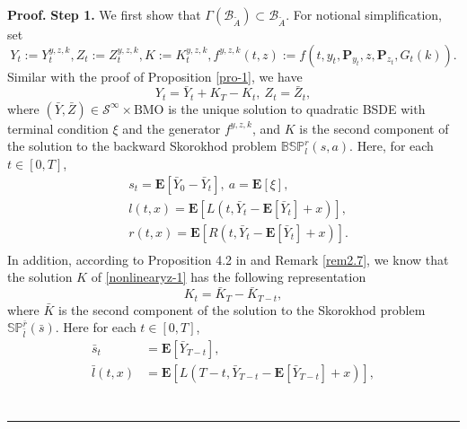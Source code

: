 \documentclass[10pt]{article}%
\numberwithin{equation}{section}
\newenvironment{proof}[1][Proof]{\noindent \textbf{#1.} }{\  \rule{0.5em}{0.5em}}
\def \E{\mathbf{E}}
\def \P{\mathbf{P}}
\begin{document}
\begin{proof}
\textbf{Step 1.} We first show that $\Gamma(\mathscr{B}_{\tilde{A}})\subset \mathscr{B}_{\tilde{A}}$. For notional simplification, set
$$Y_t:=Y^{y,z,k}_t, Z_t:=Z^{y,z,k}_t,K:=K^{y,z,k}_t,f^{y,z,k}(t,z):=f(t,y_t,\P_{y_t},z,\P_{z_{t}},G_{t}(k)).$$
Similar with the proof of Proposition \ref{pro-1}, we have 
 \begin{equation}\label{YmZm}
   Y_{t}=\bar{Y}_{t}+K_{T}-K_{t},\ Z_t=\bar{Z}_{t},
 \end{equation}
 where $(\bar{Y},\bar{Z})\in \mathcal{S}^{\infty}\times \text{BMO}$ is the unique solution to quadratic BSDE with terminal condition $\xi$ and the generator $f^{y,z,k}$, and $K$ is the second component of the solution to the backward Skorokhod problem $\mathbb{BSP}_{l}^{r}(s,a)$. Here, for each $t\in[0,T]$,  
\begin{equation}\begin{split}
&s_t=\E\left[\bar{Y}_{0}-\bar{Y}_{t}\right],\ a=\mathbf{E}[\xi],\\
&l(t,x)=\E\left[L(t,\bar{Y}_{t}-\E\left[\bar{Y}_{t}\right]+x)\right],\\
&r(t,x)=\E\left[R(t,\bar{Y}_{t}-\E\left[\bar{Y}_{t}\right]+x)\right].\\
\end{split}\end{equation}
In addition, according to Proposition 4.2 in \cite{L} and Remark \ref{rem2.7}, we know that the solution $K$ of \eqref{nonlinearyz-1} has the following representation 
\begin{equation}\label{kbark}
K_t=\bar{K}_{T}-\bar{K}_{T-t},
\end{equation}
where $\bar{K}$ is the second component of the solution to the Skorokhod problem $\mathbb{SP}_{\bar{l}}^{\bar{r}}(\bar{s})$.
Here for each $t\in[0,T]$,  
\begin{equation}\label{salr}\begin{split}
\bar{s}_t&=\E\left[\bar{Y}_{T-t}\right],\\
\bar{l}(t,x)&=\E\left[L(T-t,\bar{Y}_{T-t}-\E\left[\bar{Y}_{T-t}\right]+x)\right],\\

\end{split}
\end{equation}
\end{proof}
\end{document}
